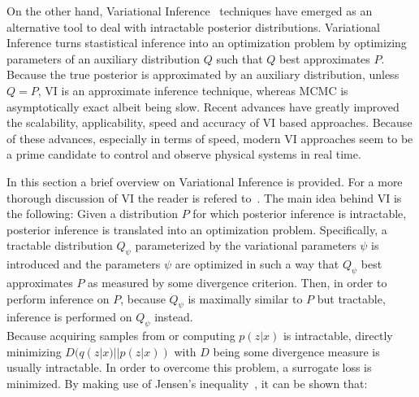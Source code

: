 \documentclass[11pt]{cmuthesis} %
\begin{document}
On the other hand, Variational Inference~\cite{wainwright2008graphical} techniques have emerged as an alternative tool to deal with intractable posterior distributions. Variational Inference turns stastistical inference into an optimization problem by optimizing parameters of an auxiliary distribution $Q$ such that $Q$ best approximates $P$. Because the true posterior is approximated by an auxiliary distribution, unless $Q=P$, VI is an approximate inference technique, whereas MCMC is asymptotically exact albeit being slow. Recent advances have greatly improved the scalability, applicability, speed and accuracy of VI based approaches. Because of these advances, especially in terms of speed, modern VI approaches seem to be a prime candidate to control and observe physical systems in real time.

In this section a brief overview on Variational Inference is provided. For a more thorough discussion of VI the reader is refered to~\cite{blei2017variational,zhang2017advances}. The main idea behind VI is the following: Given a distribution $P$ for which posterior inference is intractable, posterior inference is translated into an optimization problem. Specifically, a tractable distribution $Q_\psi$ parameterized by the variational parameters $\psi$ is introduced and the parameters $\psi$ are optimized in such a way that $Q_\psi$ best approximates $P$ as measured by some divergence criterion. Then, in order to perform inference on $P$, because $Q_\psi$ is maximally similar to $P$ but tractable, inference is performed on $Q_\psi$ instead.\\
Because acquiring samples from or computing $p(z|x)$ is intractable, directly minimizing $D(q(z|x)||p(z|x))$ with $D$ being some divergence measure is usually intractable. In order to overcome this problem, a surrogate loss is minimized. By making use of Jensen's inequality~\cite{kuczma2009introduction}, it can be shown that:
\end{document}
